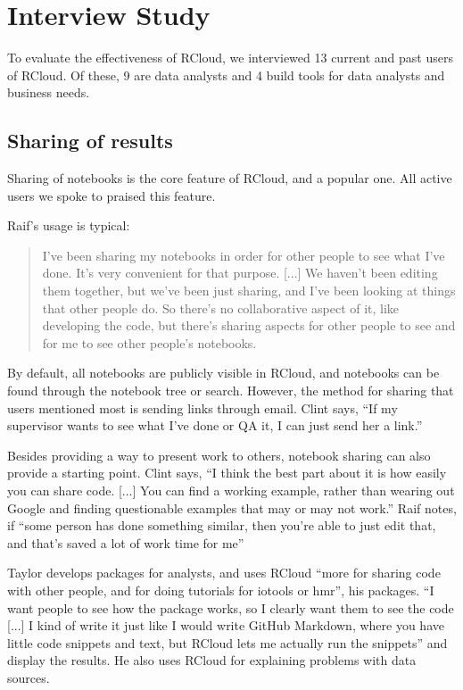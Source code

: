 \section{Interview Study\label{sec:interviews}}

To evaluate the effectiveness of RCloud, we interviewed 13 current and past
users of RCloud. Of these, 9 are data analysts and 4 build tools for data
analysts and business needs.


\subsection{Sharing of results}
Sharing of notebooks is the core feature of RCloud, and a popular one. All
active users we spoke to praised this feature.

Raif's usage is typical:
\begin{quote}
I've been sharing my notebooks in order for other people to see what
I've done. It's very convenient for that purpose. [...] We haven't
been editing them together, but we've been just sharing, and I've been looking
at things that other people do. So there's no collaborative aspect of it, like
developing the code, but there's sharing aspects for other people to see and for
me to see other people's notebooks.
\end{quote}

By default, all notebooks are publicly visible in RCloud, and notebooks can be
found through the notebook tree or search. However, the method for sharing that
users mentioned most is sending links through email. Clint says, ``If my supervisor
wants to see what I've done or QA it, I can just send her a link.''

Besides providing a way to present work to others, notebook sharing can also
provide a starting point. Clint says, ``I think the best part about it is how
easily you can share code. [...] You can find a working example, rather than wearing
out Google and finding questionable examples that may or may not work.'' Raif
notes, if ``some person has done something similar, then you're able to just
edit that, and that's saved a lot of work time for me''

Taylor develops packages for analysts, and uses RCloud ``more for sharing code with
other people, and for doing tutorials for iotools or hmr'', his packages.
``I want people to see how the package works, so I clearly want them
to see the code [...] I kind of write it just like I would write GitHub
Markdown, where you have little code snippets and text, but RCloud lets me
actually run the snippets'' and display the results. He also uses RCloud for
explaining problems with data sources.

